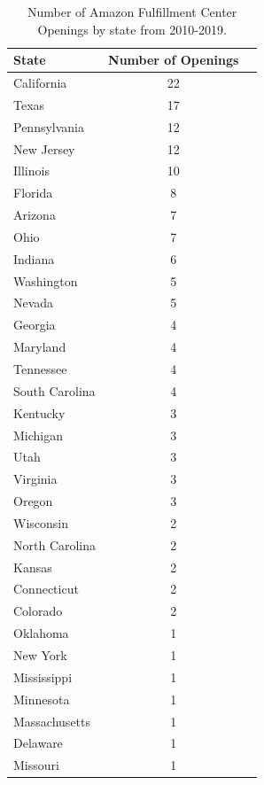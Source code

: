 \documentclass[11pt]{article}
\begin{document}
\begin{table}[H]
\centering
\begin{tabular}[H]{lcc}
\toprule
State&Number of Openings\\
\midrule
California	&22\\
Texas	&17\\
Pennsylvania	&12\\
New Jersey	&12\\
Illinois	&10\\
Florida	&8\\
Arizona	&7\\
Ohio	&7\\
Indiana	&6\\
Washington	&5\\
Nevada	&5\\
Georgia	&4\\
Maryland	&4\\
Tennessee	&4\\
South Carolina	&4\\
Kentucky	&3\\
Michigan	&3\\
Utah	&3\\
Virginia	&3\\
Oregon	&3\\
Wisconsin	&2\\
North Carolina	&2\\
Kansas	&2\\
Connecticut	&2\\
Colorado	&2\\
Oklahoma	&1\\
New York	&1\\
Mississippi	&1\\
Minnesota	&1\\
Massachusetts	&1\\
Delaware	&1\\
Missouri	&1\\
\bottomrule
\end{tabular}
\caption{Number of Amazon Fulfillment Center Openings by state from 2010-2019.}
\end{table}%
\end{document}
